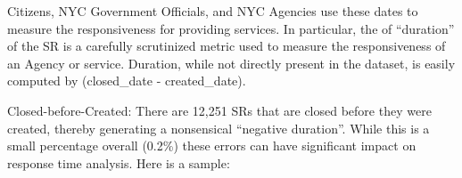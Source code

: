 \documentclass[12pt, titlepage]{article}
\begin{document}
	
Citizens, NYC Government Officials, and NYC Agencies use 
these dates to measure the responsiveness for providing 
services. In particular, the of ``duration'' of the SR 
is a carefully scrutinized metric used to measure the responsiveness
of an Agency or service. Duration, while not directly present 
in the dataset, is easily computed by (closed\_date - created\_date).
	
Closed-before-Created:  There are 12,251 SRs that are closed before they 
were created, thereby generating a nonsensical ``negative duration''. 
While this is a small percentage overall (0.2\%) these errors can 
have significant impact on response time analysis. 
Here is a sample:

\end{document}
